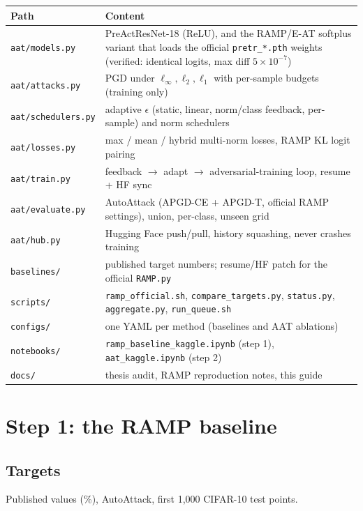 \documentclass[11pt,a4paper]{article}
\newcommand{\code}[1]{\texttt{\small #1}}
\begin{document}
\begin{table}[h]
\centering\small
\begin{tabularx}{\linewidth}{@{}lX@{}}
\toprule
Path & Content \\
\midrule
\code{aat/models.py} & PreActResNet-18 (ReLU), and the RAMP/E-AT softplus variant that loads the official \code{pretr\_*.pth} weights (verified: identical logits, max diff $5\times10^{-7}$) \\
\code{aat/attacks.py} & PGD under $\ell_\infty,\ell_2,\ell_1$ with per-sample budgets (training only) \\
\code{aat/schedulers.py} & adaptive $\epsilon$ (static, linear, norm/class feedback, per-sample) and norm schedulers \\
\code{aat/losses.py} & max / mean / hybrid multi-norm losses, RAMP KL logit pairing \\
\code{aat/train.py} & feedback $\rightarrow$ adapt $\rightarrow$ adversarial-training loop, resume + HF sync \\
\code{aat/evaluate.py} & AutoAttack (APGD-CE + APGD-T, official RAMP settings), union, per-class, unseen grid \\
\code{aat/hub.py} & Hugging Face push/pull, history squashing, never crashes training \\
\code{baselines/} & published target numbers; resume/HF patch for the official \code{RAMP.py} \\
\code{scripts/} & \code{ramp\_official.sh}, \code{compare\_targets.py}, \code{status.py}, \code{aggregate.py}, \code{run\_queue.sh} \\
\code{configs/} & one YAML per method (baselines and AAT ablations) \\
\code{notebooks/} & \code{ramp\_baseline\_kaggle.ipynb} (step 1), \code{aat\_kaggle.ipynb} (step 2) \\
\code{docs/} & thesis audit, RAMP reproduction notes, this guide \\
\bottomrule
\end{tabularx}
\end{table}

\section{Step 1: the RAMP baseline}

\subsection{Targets}
Published values (\%), AutoAttack, first 1{,}000 CIFAR-10 test points.
\end{document}

